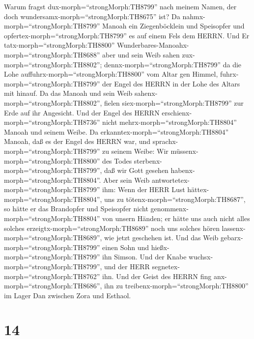 Warum fragst dux-morph=``strongMorph:TH8799'' nach meinem Namen, der
doch wundersamx-morph=``strongMorph:TH8675'' ist?  Da
nahmx-morph=``strongMorph:TH8799'' Manoah ein Ziegenböcklein und
Speisopfer und opfertex-morph=``strongMorph:TH8799'' es auf einem Fels
dem HERRN. Und Er tatx-morph=``strongMorph:TH8800''
Wunderbares-Manoahx-morph=``strongMorph:TH8688'' aber und sein Weib
sahen zux-morph=``strongMorph:TH8802''; 
dennx-morph=``strongMorph:TH8799'' da die Lohe
auffuhrx-morph=``strongMorph:TH8800'' vom Altar gen Himmel,
fuhrx-morph=``strongMorph:TH8799'' der Engel des HERRN in der Lohe des
Altars mit hinauf. Da das Manoah und sein Weib
sahenx-morph=``strongMorph:TH8802'', fielen
siex-morph=``strongMorph:TH8799'' zur Erde auf ihr Angesicht.
 Und der Engel des HERRN
erschienx-morph=``strongMorph:TH8736'' nicht
mehrx-morph=``strongMorph:TH8804'' Manoah und seinem Weibe. Da
erkanntex-morph=``strongMorph:TH8804'' Manoah, daß es der Engel des
HERRN war,  und sprachx-morph=``strongMorph:TH8799'' zu
seinem Weibe: Wir müssenx-morph=``strongMorph:TH8800'' des Todes
sterbenx-morph=``strongMorph:TH8799'', daß wir Gott gesehen
habenx-morph=``strongMorph:TH8804''.  Aber sein Weib
antwortetex-morph=``strongMorph:TH8799'' ihm: Wenn der HERR Lust
hättex-morph=``strongMorph:TH8804'', uns zu
tötenx-morph=``strongMorph:TH8687'', so hätte er das Brandopfer und
Speisopfer nicht genommenx-morph=``strongMorph:TH8804'' von unsern
Händen; er hätte uns auch nicht alles solches
erzeigtx-morph=``strongMorph:TH8689'' noch uns solches hören
lassenx-morph=``strongMorph:TH8689'', wie jetzt geschehen ist.
 Und das Weib gebarx-morph=``strongMorph:TH8799'' einen
Sohn und hießx-morph=``strongMorph:TH8799'' ihn Simson. Und der Knabe
wuchsx-morph=``strongMorph:TH8799'', und der HERR
segnetex-morph=``strongMorph:TH8762'' ihn.  Und der Geist
des HERRN fing anx-morph=``strongMorph:TH8686'', ihn zu
treibenx-morph=``strongMorph:TH8800'' im Lager Dan zwischen Zora und
Esthaol.

\hypertarget{section-13}{%
\section{14}\label{section-13}}


